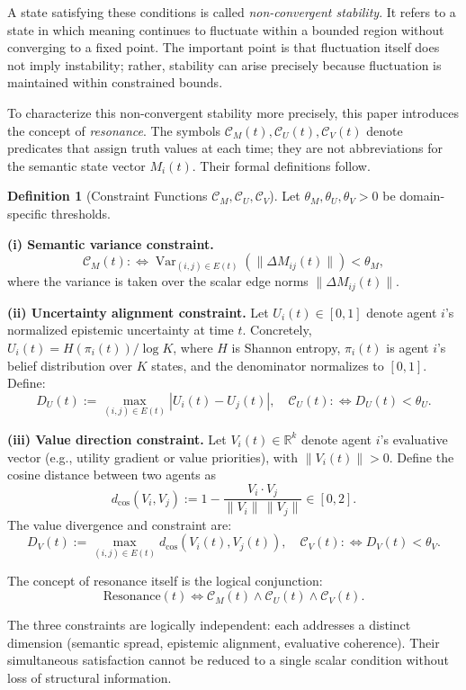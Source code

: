 \documentclass[11pt,a4paper]{article}
\theoremstyle{definition}
\newtheorem{definition}{Definition}[section]
\begin{document}
A state satisfying these conditions is called \textit{non-convergent stability}. It refers to a state in which meaning continues to fluctuate within a bounded region without converging to a fixed point. The important point is that fluctuation itself does not imply instability; rather, stability can arise precisely because fluctuation is maintained within constrained bounds.

To characterize this non-convergent stability more precisely, this paper introduces the concept of \textit{resonance}. The symbols $\mathcal{C}_M(t), \mathcal{C}_U(t), \mathcal{C}_V(t)$ denote predicates that assign truth values at each time; they are not abbreviations for the semantic state vector $M_i(t)$. Their formal definitions follow.

\begin{definition}[Constraint Functions $\mathcal{C}_M, \mathcal{C}_U, \mathcal{C}_V$]
Let $\theta_M, \theta_U, \theta_V > 0$ be domain-specific thresholds.

\textbf{(i) Semantic variance constraint.}
\[
\mathcal{C}_M(t) :\Leftrightarrow
\operatorname{Var}_{(i,j)\in E(t)}\!\left(\|\Delta M_{ij}(t)\|\right) < \theta_M,
\]
where the variance is taken over the scalar edge norms $\|\Delta M_{ij}(t)\|$.

\textbf{(ii) Uncertainty alignment constraint.}
Let $U_i(t) \in [0,1]$ denote agent $i$'s normalized epistemic uncertainty at time $t$. Concretely, $U_i(t) = H(\pi_i(t)) / \log K$, where $H$ is Shannon entropy, $\pi_i(t)$ is agent $i$'s belief distribution over $K$ states, and the denominator normalizes to $[0,1]$. Define:
\[
D_U(t) := \max_{(i,j) \in E(t)} |U_i(t) - U_j(t)|, \quad \mathcal{C}_U(t) :\Leftrightarrow D_U(t) < \theta_U.
\]

\textbf{(iii) Value direction constraint.}
Let $V_i(t) \in \mathbb{R}^k$ denote agent $i$'s evaluative vector (e.g., utility gradient or value priorities), with $\|V_i(t)\| > 0$. Define the cosine distance between two agents as
\[
d_{\cos}(V_i, V_j) := 1 - \frac{V_i \cdot V_j}{\|V_i\|\,\|V_j\|} \in [0, 2].
\]
The value divergence and constraint are:
\[
D_V(t) := \max_{(i,j) \in E(t)} d_{\cos}(V_i(t), V_j(t)), \quad \mathcal{C}_V(t) :\Leftrightarrow D_V(t) < \theta_V.
\]
\end{definition}

The concept of resonance itself is the logical conjunction:
\[
\mathrm{Resonance}(t)
\iff
\mathcal{C}_M(t)
\land
\mathcal{C}_U(t)
\land
\mathcal{C}_V(t).
\]

The three constraints are logically independent: each addresses a distinct dimension (semantic spread, epistemic alignment, evaluative coherence). Their simultaneous satisfaction cannot be reduced to a single scalar condition without loss of structural information.
\end{document}
